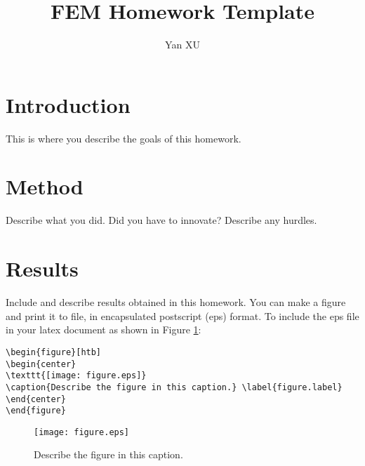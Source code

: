\documentclass{article}
\title{FEM Homework Template}
\author{Yan XU}
\begin{document}
\maketitle

\section{Introduction}

This is where you describe the goals of this homework.

\section{Method}

Describe what you did. Did you have to innovate? Describe any
hurdles.

\section{Results}

Include and describe results obtained in this homework. You can make
a figure and print it to file, in encapsulated postscript (eps)
format. To include the eps file in your latex document as shown in
Figure \ref{figure.label}:
\begin{verbatim}
\begin{figure}[htb]
\begin{center}
\texttt{[image: figure.eps]}
\caption{Describe the figure in this caption.} \label{figure.label}
\end{center}
\end{figure}
\end{verbatim}

\begin{figure}[htb]
\begin{center}
\texttt{[image: figure.eps]}
\caption{Describe the figure in this caption.} \label{figure.label}
\end{center}
\end{figure}
\end{document}
